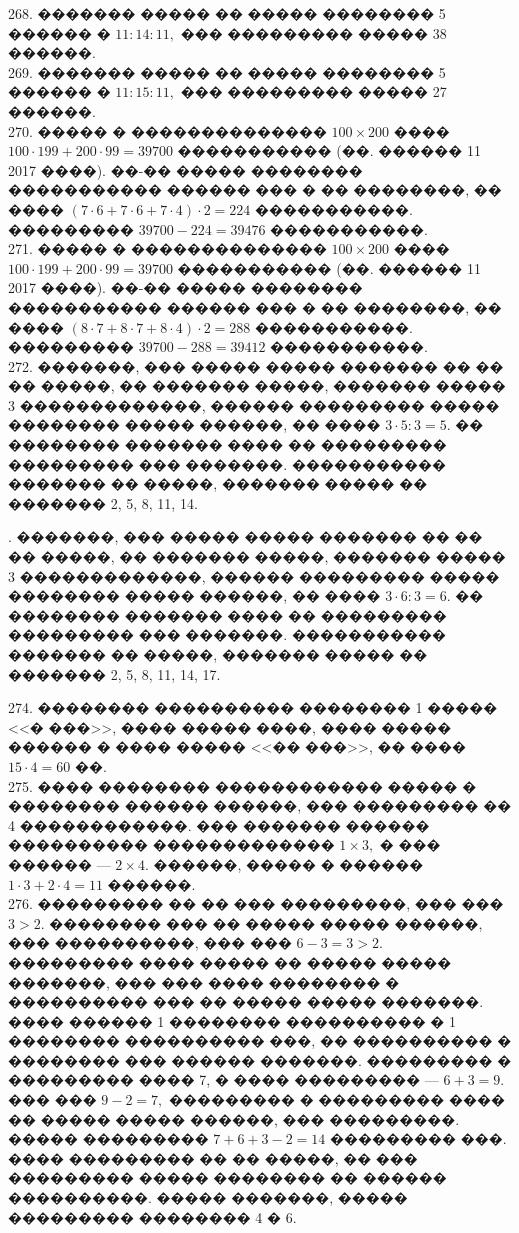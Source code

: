 \documentclass[12pt]{article}
\begin{document}
268. ������� ����� �� ����� �������� 5 ������ � $11:14:11,$ ��� ��������� ����� 38 ������.\\
269. ������� ����� �� ����� �������� 5 ������ � $11:15:11,$ ��� ��������� ����� 27 ������.\\
270. ����� � �������������� $100\times200$ ���� $100\cdot199+200\cdot99=39700$ ����������� (��. ������ 11 2017 ����). ��-�� ����� �������� ����������� ������ ��� � �� ��������, �� ���� $(7\cdot6+7\cdot6+7\cdot4)\cdot2=224$ �����������. ��������� $39700-224=39476$ �����������.\\
271. ����� � �������������� $100\times200$ ���� $100\cdot199+200\cdot99=39700$ ����������� (��. ������ 11 2017 ����). ��-�� ����� �������� ����������� ������ ��� � �� ��������, �� ���� $(8\cdot7+8\cdot7+8\cdot4)\cdot2=288$ �����������. ��������� $39700-288=39412$ �����������.\\
272. �������, ��� ����� ����� ������� �� �� �� �����, �� ������� �����, ������� ����� 3 �������������, ������ ��������� ����� �������� ����� ������, �� ���� $3\cdot5:3=5.$ �� �������� ������� ���� �� ��������� ��������� ��� �������. ����������� ������� �� �����, ������� ����� �� ������� 2, 5, 8, 11, 14.
\begin{center}
\begin{figure}[ht!]
\end{figure}
\end{center}
\newpage{}. �������, ��� ����� ����� ������� �� �� �� �����, �� ������� �����, ������� ����� 3 �������������, ������ ��������� ����� �������� ����� ������, �� ���� $3\cdot6:3=6.$ �� �������� ������� ���� �� ��������� ��������� ��� �������. ����������� ������� �� �����, ������� ����� �� ������� 2, 5, 8, 11, 14, 17.
\begin{center}
\begin{figure}[ht!]
\end{figure}
\end{center}
274. �������� ���������� �������� 1 ����� <<� ���>>, ���� ����� ����, ���� ����� ������ � ���� ����� <<�� ���>>, �� ���� $15\cdot4=60$ ��.\\
275. ���� �������� ������������ ����� � �������� ������ ������, ��� ��������� �� 4 ������������. ��� ������� ������ ���������� ������������� $1\times3,$ � ��� ������ --- $2\times4.$ ������, ����� � ������ $1\cdot3+2\cdot4=11$ ������.\\
276. ��������� �� �� ��� ���������, ��� ��� $3>2.$ �������� ��� �� ����� ����� ������, ��� ����������, ��� ��� $6-3=3>2.$ ��������� ���� ����� �� ����� ����� �������, ��� ��� ���� �������� � ���������� ��� �� ����� ����� �������. ���� ������ 1 �������� ���������� � 1 �������� ���������� ���, �� ���������� � �������� ��� ������ �������. ��������� � ��������� ���� 7, � ���� ��������� --- $6+3=9.$ ��� ��� $9-2=7,$ ��������� � ��������� ���� �� ����� ����� ������, ��� ���������. ����� ��������� $7+6+3-2=14$ ��������� ���. ���� ��������� �� �� �����, �� ��� ��������� ����� �������� �� ������ ����������. ����� �������, ����� ��������� �������� 4 � 6.\\
\end{document}
